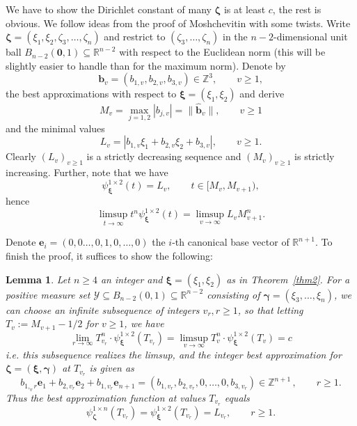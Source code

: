 \documentclass[10pt]{amsart}
\newtheorem{lemma}[theorem]{Lemma}
\theoremstyle{definition}
\newcommand{\ux}{\boldsymbol{\xi}}
\newcommand{\ee}{\boldsymbol{e}}
\newcommand{\uz}{\boldsymbol{\zeta}}
\newcommand{\bb}{\boldsymbol{b}}
\newcommand{\R}{\mathbb{R}}
\newcommand{\Z}{\mathbb{Z}}
\begin{document}
We have to show the Dirichlet constant of many $\uz$  
is at least $c$, the rest is obvious.
We follow ideas from the proof of Moshchevitin \cite[Theorem 12]{ngm} with some twists. Write $\uz=(\xi_{1},\xi_{2},\zeta_{3}, \dots , \zeta_{n})$ and restrict to $(\zeta_{3},\dots, \zeta_{n})$ in the $n-2$-dimensional unit ball $B_{n-2}(\boldsymbol{0},1)\subseteq \R^{n-2}$ with respect to the Euclidean norm (this will be slightly easier to handle than for the maximum norm). Denote by 
\[
\boldsymbol{b}_v=(b_{1,v},b_{2,v},b_{3,v})\in\Z^3, \qquad v\ge 1,
\]
the best approximations with respect to 
$\ux=(\xi_1,\xi_2)$ and derive 
\[
M_v= \max_{j=1,2} |b_{j,v}|= \|\hat{\bb}_{v}\|, \qquad v\ge 1
\] 
and the minimal values
\[
L_v= |b_{1,v} \xi_1 + b_{2,v} \xi_2 + b_{3,v}|, \qquad v\ge 1.
\] 
Clearly $(L_{v})_{v\geq 1}$ is a strictly decreasing sequence and $(M_{v})_{v\geq 1}$ is strictly increasing.
Further, note that we have
\[
\psi_{\ux}^{1\times 2}(t)= L_v, \qquad t\in [M_v, M_{v+1}),
\]
hence
\begin{equation} \label{eq:tT} \limsup_{t\to \infty} t^{n}\psi_{\ux}^{1\times 2}(t) = \limsup_{v\to\infty} L_v M_{v+1}^{n}.
\end{equation}

Denote $\ee_i=(0,0\ldots,0,1,0,\ldots,0)$ the $i$-th canonical base vector
of $\R^{n+1}$. 
To finish the proof, it suffices
to show the following: 

\begin{lemma} \label{lema}
	Let $n\ge 4$ an integer and $\ux=(\xi_1,\xi_2)$ as in Theorem~\ref{thm2}.
	For a positive measure set $\mathcal{Y}\subseteq B_{n-2}(0,1)\subseteq \R^{n-2}$ consisting
	of $\boldsymbol{\gamma}=(\xi_3,\ldots,\xi_n)$, we can choose an infinite subsequence of
	integers $v_r, r\ge 1$, so that 
    letting $T_{v}:=M_{v+1}-1/2$ for $v\ge 1$, we have
      \begin{equation} \label{eq:igno}
    \lim_{r\to\infty} T_{v_r}^n\cdot \psi_{\ux}^{1\times 2}(T_{v_{r}})
    = \limsup_{v\to\infty} T_{v}^n\cdot \psi_{\ux}^{1\times 2}(T_{v})
    =c
    \end{equation}
    i.e. this subsequence realizes the limsup, and 
	the integer best approximation  
	for $\uz=(\ux, \boldsymbol{\gamma})$ at $T_{v_{r}}$ is given as
	\[
	b_{1,_v{r}}\ee_1+  b_{2,v_r}\ee_2+   b_{1,v_r}\ee_{n+1}=
	(b_{1,v_{r}},b_{2,v_r},0,\ldots,0,b_{3,v_r})\in \Z^{n+1}\,, \qquad r\ge 1.
	\]
	Thus the best approximation function at values $T_{v_r}$ equals
	\[
	\psi_{\uz}^{1\times n}(T_{v_{r}})=\psi_{\ux}^{1\times 2}(T_{v_{r}})= L_{v_r},\qquad r\ge 1.
	\] 
\end{lemma}
\end{document}
